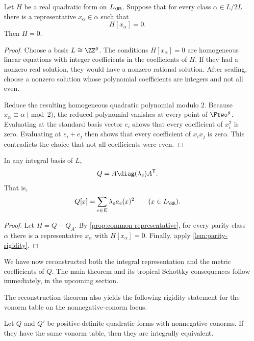 \documentclass[11pt,letterpaper]{amsart}
\begin{document}
\begin{lemma}\cite[Lemma 3.1]{sikiric2022iso}\label{lem:parity-rigidity}
Let $H$ be a real quadratic form on $L_{\RR}$.  Suppose that for every class $\alpha\in L/2L$ there is a representative $x_\alpha\in\alpha$ such that
\[
  H[x_\alpha]=0.
\]
Then $H=0$.
\end{lemma}

\begin{proof}
Choose a basis $L\cong\ZZ^g$.  The conditions $H[x_\alpha]=0$ are homogeneous linear equations with integer coefficients in the coefficients of $H$.  If they had a nonzero real solution, they would have a nonzero rational solution.  After scaling, choose a nonzero solution whose polynomial coefficients are integers and not all even.

Reduce the resulting homogeneous quadratic polynomial modulo $2$.  Because $x_\alpha\equiv\alpha\pmod2$, the reduced polynomial vanishes at every point of $\Ftwo^g$.  Evaluating at the standard basis vector $e_i$ shows that every coefficient of $x_i^2$ is zero.  Evaluating at $e_i+e_j$ then shows that every coefficient of $x_ix_j$ is zero.  This contradicts the choice that not all coefficients were even.
\end{proof}

\begin{theorem}\label{thm:Q-reconstruction}
    In any integral basis of $L$,
\[
  Q=A\diag(\lambda_e)A^{\mathsf T}.
\]
That is,
\[Q[x]=\sum_{e\in E}\lambda_e a_e(x)^2
  \qquad(x\in L_{\RR}).\]
\end{theorem}
\begin{proof}
    Let $H=Q-Q_A$.  By \cref{prop:common-representative}, for every parity class $\alpha$ there is a representative $x_\alpha$ with $H[x_\alpha]=0$.  Finally, apply \cref{lem:parity-rigidity}.
\end{proof}

We have now reconstructed both the integral representation and the metric coefficients of $Q$. The main theorem and its tropical Schottky consequences follow immediately, in the upcoming section.

The reconstruction theorem also yields the following rigidity statement for the vonorm table on the nonnegative-conorm locus.

\begin{corollary}
Let $Q$ and $Q'$ be positive-definite quadratic forms with
nonnegative conorms. If they have the same vonorm table, then they are integrally equivalent.
\end{corollary}
\end{document}
